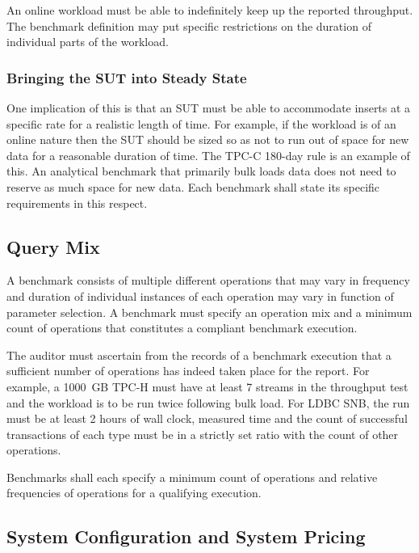 An online workload must be able to indefinitely keep up the reported throughput. The benchmark definition may put specific restrictions on the duration of individual parts of the workload.

\subsubsection{Bringing the SUT into Steady State} One implication of this is that an SUT must be able to accommodate inserts at a specific rate for a realistic length of time. For example, if the workload is of an online nature then the SUT should be sized so as not to run out of space for new data for a reasonable duration of time. The TPC-C 180-day rule is an example of this. An analytical benchmark that primarily bulk loads data does not need to reserve as much space for new data. Each benchmark shall state its specific requirements in this respect.

\subsection{Query Mix}

A benchmark consists of multiple different operations that may vary in frequency and duration of individual
instances of each operation may vary in function of parameter selection. A benchmark must specify an operation
mix and a minimum count of operations that constitutes a compliant benchmark execution.

The auditor must ascertain from the records of a benchmark execution that a sufficient number of operations has indeed taken place for the report. For example, a 1000~GB TPC-H must have at least 7 streams in the throughput test and the workload is to be run twice following bulk load. For LDBC SNB, the run must be at least 2 hours of wall clock, measured time and the count of successful transactions of each type must be in a strictly set ratio with the count of other operations. 

Benchmarks shall each specify a minimum count of operations and relative frequencies of operations for a qualifying
execution.

\subsection{System Configuration and System Pricing}
\label{sec:system-config}


